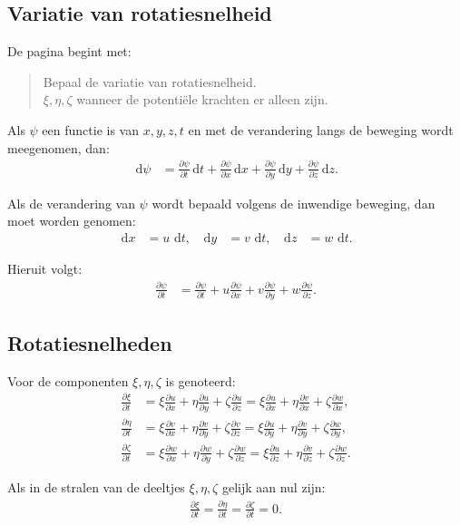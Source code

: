 \documentclass[11pt]{article}
\newcommand{\dd}{\,\mathrm{d}}
\newcommand{\pd}[2]{\frac{\partial #1}{\partial #2}}
\begin{document}
\subsection*{Variatie van rotatiesnelheid}

De pagina begint met:
\begin{quote}
Bepaal de variatie van rotatiesnelheid. \\
$\xi,\eta,\zeta$ wanneer de potentiële krachten er alleen zijn.
\end{quote}

Als $\psi$ een functie is van $x,y,z,t$ en met de verandering langs de beweging wordt meegenomen, dan:
\begin{align*}
\dd\psi
&=
\pd{\psi}{t}\dd t
+\pd{\psi}{x}\dd x
+\pd{\psi}{y}\dd y
+\pd{\psi}{z}\dd z .
\end{align*}

Als de verandering van $\psi$ wordt bepaald volgens de inwendige beweging, dan moet worden genomen:
\begin{align*}
\dd x &= u\,\dd t,
&
\dd y &= v\,\dd t,
&
\dd z &= w\,\dd t.
\end{align*}

Hieruit volgt:
\begin{align*}
\pd{\psi}{t}
&=
\pd{\psi}{t}
+u\pd{\psi}{x}
+v\pd{\psi}{y}
+w\pd{\psi}{z}.
\end{align*}

\subsection*{Rotatiesnelheden}

Voor de componenten $\xi,\eta,\zeta$ is genoteerd:
\begin{align*}
\pd{\xi}{t}
&=
\xi\pd{u}{x}
+\eta\pd{u}{y}
+\zeta\pd{u}{z}
=
\xi\pd{u}{x}
+\eta\pd{v}{x}
+\zeta\pd{w}{x},
\\
\pd{\eta}{t}
&=
\xi\pd{v}{x}
+\eta\pd{v}{y}
+\zeta\pd{v}{z}
=
\xi\pd{u}{y}
+\eta\pd{v}{y}
+\zeta\pd{w}{y},
\\
\pd{\zeta}{t}
&=
\xi\pd{w}{x}
+\eta\pd{w}{y}
+\zeta\pd{w}{z}
=
\xi\pd{u}{z}
+\eta\pd{v}{z}
+\zeta\pd{w}{z}.
\end{align*}

Als in de stralen van de deeltjes $\xi,\eta,\zeta$ gelijk aan nul zijn:
\begin{align*}
\pd{\xi}{t}
=
\pd{\eta}{t}
=
\pd{\zeta}{t}
=
0.
\end{align*}

\newpage
\end{document}
